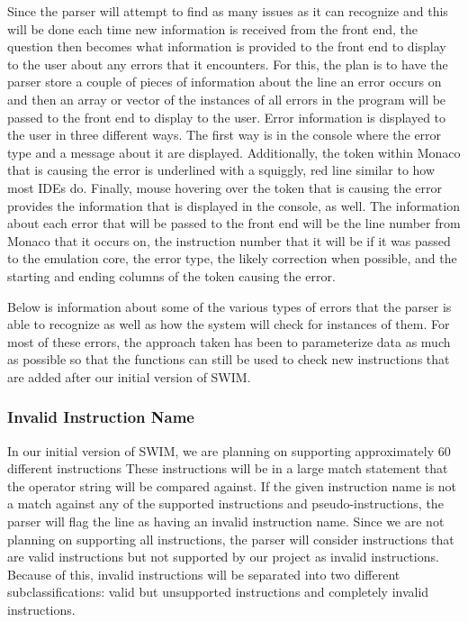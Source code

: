 \documentclass[
    paper=letter,
    parskip=half,
    fontsize=12pt,
    titlepage=firstiscover,
    toc=bibliography,
    numbers=endperiod
]{scrartcl}
\begin{document}
Since the parser will attempt to find as many issues as it can recognize
and this will be done each time new information is received from the
front end, the question then becomes what information is provided to the
front end to display to the user about any errors that it encounters.
For this, the plan is to have the parser store a couple of pieces of
information about the line an error occurs on and then an array or
vector of the instances of all errors in the program will be passed to
the front end to display to the user. Error information is displayed to
the user in three different ways. The first way is in the console where
the error type and a message about it are displayed. Additionally, the
token within Monaco that is causing the error is underlined with a
squiggly, red line similar to how most IDEs do. Finally, mouse hovering
over the token that is causing the error provides the information that
is displayed in the console, as well. The information about each error
that will be passed to the front end will be the line number from Monaco
that it occurs on, the instruction number that it will be if it was
passed to the emulation core, the error type, the likely correction when
possible, and the starting and ending columns of the token causing the
error.

Below is information about some of the various types of errors that the
parser is able to recognize as well as how the system will check for
instances of them. For most of these errors, the approach taken has been
to parameterize data as much as possible so that the functions can still
be used to check new instructions that are added after our initial
version of SWIM.

\subsubsection{Invalid Instruction Name}

In our initial version of SWIM, we are planning on supporting
approximately 60 different instructions These instructions will be in a
large match statement that the operator string will be compared against.
If the given instruction name is not a match against any of the
supported instructions and pseudo-instructions, the parser will flag the
line as having an invalid instruction name. Since we are not planning on
supporting all instructions, the parser will consider instructions that
are valid instructions but not supported by our project as invalid
instructions. Because of this, invalid instructions will be separated
into two different subclassifications: valid but unsupported
instructions and completely invalid instructions.
\end{document}

